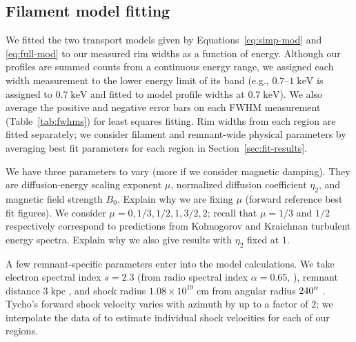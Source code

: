 \documentclass[iop, apj, numberedappendix, twocolappendix]{emulateapj}
\newcommand*{\mt}{\mathrm}
\newcommand*{\unit}[1]{\;\mt{#1}}  %
\begin{document}
\subsection{Filament model fitting}
\label{sec:fits}

We fitted the two transport models given by Equations~\eqref{eq:simp-mod} and
\eqref{eq:full-mod} to our measured rim widths as a function of energy.
Although our profiles are summed counts from a continuous energy range, we
assigned each width measurement to the lower energy limit of its band
(e.g., $0.7$--$1 \unit{keV}$ is assigned to $0.7 \unit{keV}$ and fitted to
model profile widths at $0.7 \unit{keV}$). 
We also average the positive and negative error bars on each FWHM measurement
(Table~\ref{tab:fwhms}) for least squares fitting.
Rim widths from each region are fitted separately; we consider filament and
remnant-wide physical parameters by averaging best fit parameters for each
region in Section~\ref{sec:fit-results}.

We have three parameters to vary (more if we consider magnetic damping).
They are diffusion-energy scaling exponent $\mu$, normalized diffusion
coefficient $\eta_2$, and magnetic field strength $B_0$.
Explain why we are fixing $\mu$ (forward reference best fit figures).
We consider $\mu = 0, 1/3, 1/2, 1, 3/2, 2$; recall that $\mu = 1/3$ and $1/2$
respectively correspond to predictions from Kolmogorov and Kraichnan turbulent
energy spectra.  Explain why we also give results with $\eta_2$ fixed at $1$.

A few remnant-specific parameters enter into the model calculations.  We take
electron spectral index $s = 2.3$ (from radio spectral index $\alpha = 0.65$,
\citet{kothes2006} ),
remnant distance $3 \unit{kpc}$ \citep[cf.][]{hayato2010}, and
shock radius $1.08 \times 10^{19} \unit{cm}$ from angular radius $240\mbox{$^{\prime\prime}$}$
\citep{green2009}.  Tycho's forward shock velocity varies with azimuth by up to
a factor of 2; we interpolate the data of \citet{williams2013} to estimate
individual shock velocities for each of our regions.
\end{document}
